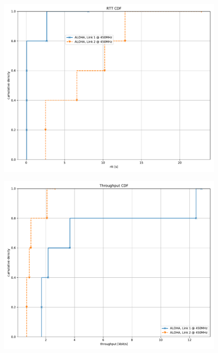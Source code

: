 \documentclass{article}
\begin{document}
\begin{figure}
	\includegraphics[width=\textwidth]{aloha_dual/cdf/rtt_cdf}
\end{figure}

\begin{figure}
	\includegraphics[width=\textwidth]{aloha_dual/cdf/throughput_cdf}
\end{figure}
\end{document}
